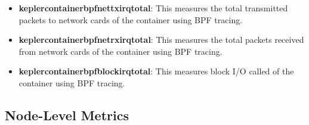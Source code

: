 \begin{itemize}
    \begin{itemize}
        \item \textbf{kepler\textunderscore container\textunderscore bpf\textunderscore net\textunderscore tx\textunderscore irq\textunderscore total}: This measures the total transmitted packets to network cards of the container using BPF tracing.
        \item \textbf{kepler\textunderscore container\textunderscore bpf\textunderscore net\textunderscore rx\textunderscore irq\textunderscore total}: This measures the total packets received from network cards of the container using BPF tracing.
        \item \textbf{kepler\textunderscore container\textunderscore bpf\textunderscore block\textunderscore irq\textunderscore total}: This measures block I/O called of the container using BPF tracing.
    \end{itemize}
\end{itemize}

\subsection{Node-Level Metrics}

